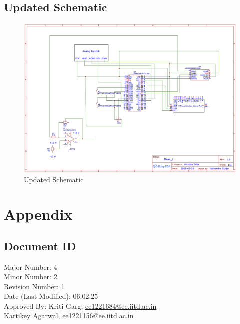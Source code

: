 \documentclass[12pt,a4paper]{article}
\begin{document}
\subsection{Updated Schematic}

\begin{figure}[H]
\centering

\includegraphics[width=\textwidth]{Updated Schematic.png}
\caption{Updated Schematic}
\label{fig:Updated Schematic}
\end{figure}







\clearpage
{}



\printbibliography
\clearpage


\section*{Appendix}

\subsection*{Document ID}
Major Number: 4 \\
Minor Number: 2 \\
Revision Number: 1 \\
Date (Last Modified): 06.02.25 \\
Approved By: Kriti Garg, \href{mailto:ee1221684@ee.iitd.ac.in}{ee1221684@ee.iitd.ac.in}\\
Kartikey Agarwal, \href{mailto:ee1221156@ee.iitd.ac.in}{ee1221156@ee.iitd.ac.in}
\end{document}
